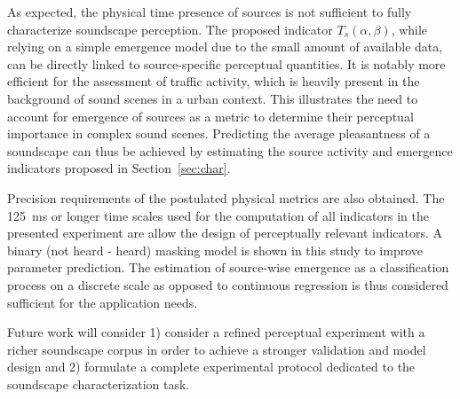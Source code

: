 \documentclass{article}
\begin{document}
\begin{sloppy}
As expected, the physical time presence of sources is not sufficient to fully characterize soundscape perception. The proposed indicator $T_s(\alpha, \beta)$, while relying on a simple emergence model due to the small amount of available data, can be directly linked to source-specific perceptual quantities. It is notably more efficient for the assessment of traffic activity, which is heavily present in the background of sound scenes in a urban context. This illustrates the need to account for emergence of sources as a metric to determine their perceptual importance in complex sound scenes. Predicting the average pleasantness of a soundscape can thus be achieved by estimating the source activity and emergence indicators proposed in Section~\ref{sec:char}.

Precision requirements of the postulated physical metrics are also obtained. The 125~ms or longer time scales used for the computation of all indicators in the presented experiment are allow the design of perceptually relevant indicators. A binary (not heard - heard) masking model is shown in this study to improve parameter prediction. The estimation of source-wise emergence as a classification process on a discrete scale as opposed to continuous regression is thus considered sufficient for the application needs.

Future work will consider 1) consider a refined perceptual experiment with a richer soundscape corpus in order to achieve a stronger validation and model design and 2) formulate a complete experimental protocol dedicated to the soundscape characterization task.




\end{sloppy}
\end{document}
